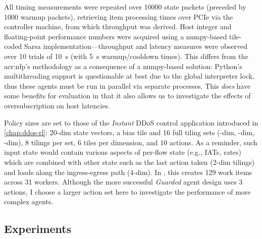 All \approachshort{} timing measurements were repeated over \num{10000} state packets (preceded by \num{1000} warmup packets), retrieving item processing times over PCIe via the controller machine, from which throughput was derived.
Host integer and floating-point performance numbers were acquired using a numpy-based tile-coded Sarsa implementation---throughput and latency measures were observed over \num{10} trials of \qty{10}{\second} (with \qty{5}{\second} warmup/cooldown times).
This differs from the \gls{acr:nfp}'s methodology as a consequence of a numpy-based solution: Python's multithreading support is questionable at best due to the global interpreter lock, thus these agents must be run in parallel via separate processes.
This \emph{does} have some benefits for evaluation in that it also allows us to investigate the effects of oversubscription on host latencies.

Policy sizes are set to those of the \emph{Instant} DDoS control application introduced in \cref{chap:ddos-rl}: 20-dim state vectors, a bias tile and 16 full tiling sets (-dim, -dim, -dim), 8 tilings per set, 6 tiles per dimension, and 10 actions.
As a reminder, such input state would contain various aspects of per-flow state (e.g., IATs, rates) which are combined with other state such as the last action taken (2-dim tilings) and loads along the ingress-egress path (4-dim).
In \Coopfw{}, this creates \num{129} work items across \num{31} workers.
Although the more successful \emph{Guarded} agent design uses 3 actions, I choose a larger action set here to investigate the performance of more complex agents.

\subsection{Experiments}

